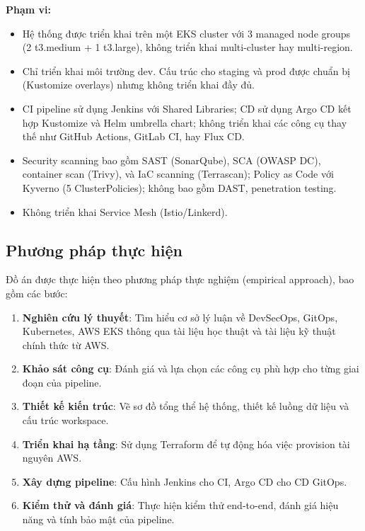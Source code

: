 \documentclass[13pt,a4paper,twoside]{extarticle}
\begin{document}
\textbf{Phạm vi:}
\begin{itemize}[leftmargin=*,nosep]
  \item Hệ thống được triển khai trên một EKS cluster với 3 managed node groups (2 t3.medium + 1 t3.large), không triển khai multi-cluster hay multi-region.
  \item Chỉ triển khai môi trường dev. Cấu trúc cho staging và prod được chuẩn bị (Kustomize overlays) nhưng không triển khai đầy đủ.
  \item CI pipeline sử dụng Jenkins với Shared Libraries; CD sử dụng Argo CD kết hợp Kustomize và Helm umbrella chart; không triển khai các công cụ thay thế như GitHub Actions, GitLab CI, hay Flux CD.
  \item Security scanning bao gồm SAST (SonarQube), SCA (OWASP DC), container scan (Trivy), và IaC scanning (Terrascan); Policy as Code với Kyverno (5 ClusterPolicies); không bao gồm DAST, penetration testing.
  \item Không triển khai Service Mesh (Istio/Linkerd).
\end{itemize}

\subsection{Phương pháp thực hiện}

Đồ án được thực hiện theo phương pháp thực nghiệm (empirical approach), bao gồm các bước:

\begin{enumerate}[leftmargin=*,nosep]
  \item \textbf{Nghiên cứu lý thuyết}: Tìm hiểu cơ sở lý luận về DevSecOps, GitOps, Kubernetes, AWS EKS thông qua tài liệu học thuật và tài liệu kỹ thuật chính thức từ AWS.
  \item \textbf{Khảo sát công cụ}: Đánh giá và lựa chọn các công cụ phù hợp cho từng giai đoạn của pipeline.
  \item \textbf{Thiết kế kiến trúc}: Vẽ sơ đồ tổng thể hệ thống, thiết kế luồng dữ liệu và cấu trúc workspace.
  \item \textbf{Triển khai hạ tầng}: Sử dụng Terraform để tự động hóa việc provision tài nguyên AWS.
  \item \textbf{Xây dựng pipeline}: Cấu hình Jenkins cho CI, Argo CD cho CD GitOps.
  \item \textbf{Kiểm thử và đánh giá}: Thực hiện kiểm thử end-to-end, đánh giá hiệu năng và tính bảo mật của pipeline.
\end{enumerate}
\end{document}
